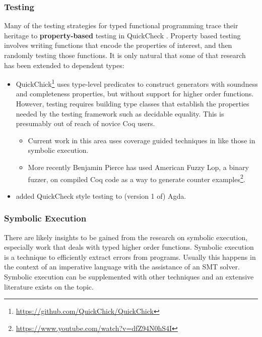 \subsubsection{Testing}
 
Many of the testing strategies for typed functional programming trace their heritage to \textbf{property-based} testing in QuickCheck \cite{quickcheck}.
Property based testing involves writing functions that encode the properties of interest, and then randomly testing those functions.
It is only natural that some of that research has been extended to dependent types:
\begin{itemize}
\item
QuickChick\footnote{\url{https://github.com/QuickChick/QuickChick}} \cite{denes2014quickchick,lampropoulos2017generating,lampropoulos2017beginner,lampropoulos2018random}
 uses type-level predicates to construct generators with soundness and completeness properties, but without support for higher order functions.
However, testing requires building type classes that establish the properties needed by the testing framework such as decidable equality.
This is presumably out of reach of novice Coq users.
\begin{itemize}
\item
Current work in this area uses coverage guided techniques in \cite{lampropoulos2019coverage} like those in symbolic execution.
\item
More recently Benjamin Pierce has used American Fuzzy Lop, a binary fuzzer, on compiled Coq code as a way to generate counter examples\footnote{\url{https://www.youtube.com/watch?v=dfZ94N0hS4I}}.
\end{itemize}
\item \cite{dybjer2003combining} added QuickCheck style testing to (version 1 of) Agda.
\end{itemize}
 
\subsubsection{Symbolic Execution}
 
There are likely insights to be gained from the research on symbolic execution, especially work that deals with typed higher order functions.
Symbolic execution is a technique to efficiently extract errors from programs.
Usually this happens in the context of an imperative language with the assistance of an SMT solver.
Symbolic execution can be supplemented with other techniques and an extensive literature exists on the topic.
 
